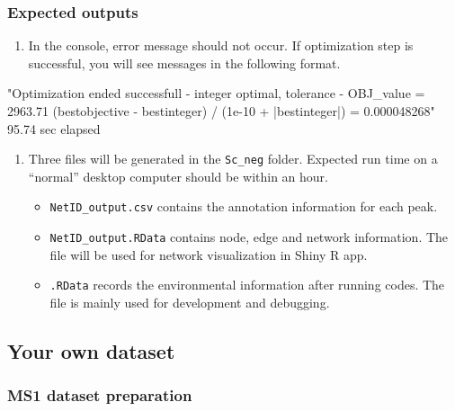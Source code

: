\documentclass[]{article}
\providecommand{\tightlist}{%
  \setlength{\itemsep}{0pt}\setlength{\parskip}{0pt}}
\renewenvironment{verbatim}{\color{codecolor}\begin{myshaded}\begin{oldverbatim}}{\end{oldverbatim}\end{myshaded}}
\begin{document}
\hypertarget{expected-outputs}{%
\subsubsection{Expected outputs}\label{expected-outputs}}

\begin{enumerate}
\def\labelenumi{\arabic{enumi}.}
\tightlist
\item
  In the console, error message should not occur. If optimization step is successful, you will see messages in the following format.
\end{enumerate}

\begin{verbatim}
"Optimization ended successfull - integer optimal, tolerance - OBJ_value = 2963.71 (bestobjective - bestinteger) / (1e-10 + |bestinteger|) = 0.000048268"
95.74 sec elapsed
\end{verbatim}

\begin{enumerate}
\def\labelenumi{\arabic{enumi}.}
\setcounter{enumi}{1}
\tightlist
\item
  Three files will be generated in the \texttt{Sc\_neg} folder. Expected run time on a ``normal'' desktop computer should be within an hour.

  \begin{itemize}
  \tightlist
  \item
    \texttt{NetID\_output.csv} contains the annotation information for each peak.\\
  \item
    \texttt{NetID\_output.RData} contains node, edge and network information. The file will be used for network visualization in Shiny R app.\\
  \item
    \texttt{.RData} records the environmental information after running codes. The file is mainly used for development and debugging.
  \end{itemize}
\end{enumerate}

\hypertarget{your-own-dataset}{%
\subsection{Your own dataset}\label{your-own-dataset}}

\hypertarget{ms1-dataset-preparation}{%
\subsubsection{MS1 dataset preparation}\label{ms1-dataset-preparation}}
\end{document}

